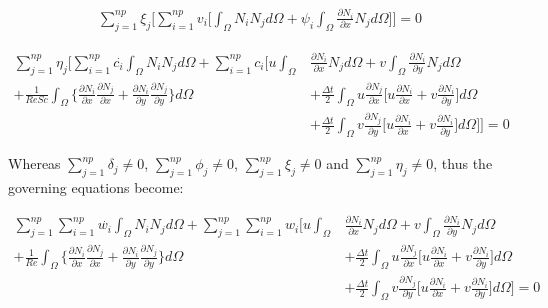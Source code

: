 \begin{equation}
 \begin{aligned}
  \sum\limits_{j=1}^{np} \xi_j \Bigg[
  \sum\limits_{i=1}^{np} v_i \Bigg[
   \int_{\Omega} N_i N_j d\Omega
 + \psi_i \int_{\Omega} \frac{\partial N_i}{\partial x} N_j d\Omega
  \Bigg] \Bigg] = 0
 \end{aligned}
\end{equation}

\begin{equation}
 \begin{aligned} 
  \sum\limits_{j=1}^{np} \eta_j \Bigg[
  \sum\limits_{i=1}^{np} \overset{.}{c_i} \int_{\Omega} N_i N_j d\Omega 
  + \sum\limits_{i=1}^{np} c_i \Bigg[
    u \int_{\Omega} & \frac{\partial N_i}{\partial x} N_j d\Omega 
  + v \int_{\Omega} \frac{\partial N_i}{\partial y} N_j d\Omega 
  \\[5pt]
  + \frac{1}{\textit{ReSc}} \int_{\Omega} \Bigg\{ 
                    \frac{\partial N_i}{\partial x} 
                    \frac{\partial N_j}{\partial x} 
  +                 \frac{\partial N_i}{\partial y} 
                    \frac{\partial N_j}{\partial y} 
  \Bigg\} d\Omega 
 & + \frac{\Delta t}{2} \int_{\Omega} u \frac{\partial N_j}{\partial x}
 \Bigg[
   u \frac{\partial N_i}{\partial x}
 + v \frac{\partial N_i}{\partial y}
 \Bigg] d\Omega
 \\[5pt]
 & + \frac{\Delta t}{2} \int_{\Omega} v \frac{\partial N_j}{\partial y}
 \Bigg[
   u \frac{\partial N_i}{\partial x}
 + v \frac{\partial N_i}{\partial y}
 \Bigg] d\Omega
  \Bigg] \Bigg] = 0
 \end{aligned}
\end{equation}


\noindent
Whereas
$\sum\limits_{j=1}^{np} \delta_j \neq 0$,
$\sum\limits_{j=1}^{np} \phi_j \neq 0$, 
$\sum\limits_{j=1}^{np} \xi_j \neq 0$ and
$\sum\limits_{j=1}^{np} \eta_j \neq 0$,
thus the governing equations become:

\begin{equation}
 \begin{aligned} 
  \sum\limits_{j=1}^{np} 
  \sum\limits_{i=1}^{np} \overset{.}{w_i} \int_{\Omega} N_i N_j d\Omega 
  + \sum\limits_{j=1}^{np} 
    \sum\limits_{i=1}^{np} w_i \Bigg[
    u \int_{\Omega} & \frac{\partial N_i}{\partial x} N_j d\Omega 
  + v \int_{\Omega} \frac{\partial N_i}{\partial y} N_j d\Omega
  \\[5pt]
  + \frac{1}{\textit{Re}} \int_{\Omega} \Bigg\{ 
                    \frac{\partial N_i}{\partial x} 
                    \frac{\partial N_j}{\partial x} 
  +                 \frac{\partial N_i}{\partial y} 
                    \frac{\partial N_j}{\partial y} 
  \Bigg\} d\Omega 
 & + \frac{\Delta t}{2} \int_{\Omega} u \frac{\partial N_j}{\partial x}
 \Bigg[
   u \frac{\partial N_i}{\partial x}
 + v \frac{\partial N_i}{\partial y}
 \Bigg] d\Omega
 \\[5pt]
 & + \frac{\Delta t}{2} \int_{\Omega} v \frac{\partial N_j}{\partial y}
 \Bigg[
   u \frac{\partial N_i}{\partial x}
 + v \frac{\partial N_i}{\partial y}
 \Bigg] d\Omega
  \Bigg] = 0
 \end{aligned}
\end{equation}

